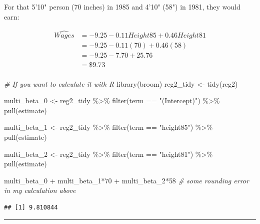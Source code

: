 \documentclass[
]{article}
\newenvironment{Shaded}{\begin{snugshade}}{\end{snugshade}}
\newcommand{\CommentTok}[1]{\textcolor[rgb]{0.56,0.35,0.01}{\textit{#1}}}
\newcommand{\DecValTok}[1]{\textcolor[rgb]{0.00,0.00,0.81}{#1}}
\newcommand{\FunctionTok}[1]{\textcolor[rgb]{0.00,0.00,0.00}{#1}}
\newcommand{\NormalTok}[1]{#1}
\newcommand{\OtherTok}[1]{\textcolor[rgb]{0.56,0.35,0.01}{#1}}
\newcommand{\SpecialCharTok}[1]{\textcolor[rgb]{0.00,0.00,0.00}{#1}}
\newcommand{\StringTok}[1]{\textcolor[rgb]{0.31,0.60,0.02}{#1}}
\begin{document}
For that 5'10" person (70 inches) in 1985 and 4'10" (58") in 1981, they
would earn:

\[\begin{align*}
    \widehat{Wages}&=-9.25-0.11Height85+0.46Height81\\
    &=-9.25-0.11(70)+0.46(58)\\
    &=-9.25-7.70+25.76\\
    &=\$9.73 \\ 
\end{align*}\]

\begin{Shaded}
\begin{Highlighting}[]
\CommentTok{\# If you want to calculate it with R}
\FunctionTok{library}\NormalTok{(broom)}
\NormalTok{reg2\_tidy }\OtherTok{\textless{}{-}} \FunctionTok{tidy}\NormalTok{(reg2)}

\NormalTok{multi\_beta\_0 }\OtherTok{\textless{}{-}}\NormalTok{ reg2\_tidy }\SpecialCharTok{\%\textgreater{}\%}
  \FunctionTok{filter}\NormalTok{(term }\SpecialCharTok{==} \StringTok{"(Intercept)"}\NormalTok{) }\SpecialCharTok{\%\textgreater{}\%}
  \FunctionTok{pull}\NormalTok{(estimate)}

\NormalTok{multi\_beta\_1 }\OtherTok{\textless{}{-}}\NormalTok{ reg2\_tidy }\SpecialCharTok{\%\textgreater{}\%}
  \FunctionTok{filter}\NormalTok{(term }\SpecialCharTok{==} \StringTok{"height85"}\NormalTok{) }\SpecialCharTok{\%\textgreater{}\%}
  \FunctionTok{pull}\NormalTok{(estimate)}

\NormalTok{multi\_beta\_2 }\OtherTok{\textless{}{-}}\NormalTok{ reg2\_tidy }\SpecialCharTok{\%\textgreater{}\%}
  \FunctionTok{filter}\NormalTok{(term }\SpecialCharTok{==} \StringTok{"height81"}\NormalTok{) }\SpecialCharTok{\%\textgreater{}\%}
  \FunctionTok{pull}\NormalTok{(estimate)}

\NormalTok{multi\_beta\_0 }\SpecialCharTok{+}\NormalTok{ multi\_beta\_1}\SpecialCharTok{*}\DecValTok{70} \SpecialCharTok{+}\NormalTok{ multi\_beta\_2}\SpecialCharTok{*}\DecValTok{58} \CommentTok{\# some rounding error in my calculation above}
\end{Highlighting}
\end{Shaded}

\begin{verbatim}
## [1] 9.810844
\end{verbatim}

\begin{center}\rule{0.5\linewidth}{0.5pt}\end{center}
\end{document}
